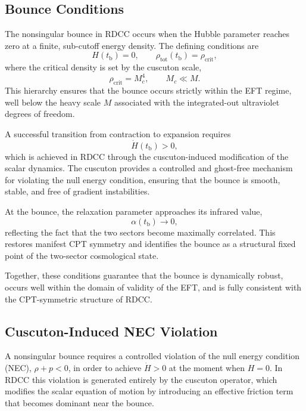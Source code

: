 \documentclass[11pt,a4paper]{article}
\begin{document}
\subsection{Bounce Conditions}

The nonsingular bounce in RDCC occurs when the Hubble parameter reaches zero at a
finite, sub-cutoff energy density. The defining conditions are
\begin{equation}
    H(t_{\mathrm{b}}) = 0,
    \qquad
    \rho_{\mathrm{tot}}(t_{\mathrm{b}}) = \rho_{\mathrm{crit}},
\end{equation}
where the critical density is set by the cuscuton scale,
\begin{equation}
    \rho_{\mathrm{crit}} = M_{c}^{4},
    \qquad
    M_{c} \ll M.
\end{equation}
This hierarchy ensures that the bounce occurs strictly within the EFT regime, well
below the heavy scale \(M\) associated with the integrated-out ultraviolet degrees of
freedom.

A successful transition from contraction to expansion requires
\begin{equation}
    \dot{H}(t_{\mathrm{b}}) > 0,
\end{equation}
which is achieved in RDCC through the cuscuton-induced modification of the scalar
dynamics. The cuscuton provides a controlled and ghost-free mechanism for violating
the null energy condition, ensuring that the bounce is smooth, stable, and free of
gradient instabilities.

At the bounce, the relaxation parameter approaches its infrared value,
\begin{equation}
    \alpha(t_{\mathrm{b}}) \longrightarrow 0,
\end{equation}
reflecting the fact that the two sectors become maximally correlated. This restores
manifest CPT symmetry and identifies the bounce as a structural fixed point of the
two-sector cosmological state.

Together, these conditions guarantee that the bounce is dynamically robust, occurs
well within the domain of validity of the EFT, and is fully consistent with the
CPT-symmetric structure of RDCC.

\subsection{Cuscuton-Induced NEC Violation}

A nonsingular bounce requires a controlled violation of the null energy condition
(NEC), \(\rho + p < 0\), in order to achieve \(\dot{H} > 0\) at the moment when
\(H = 0\). In RDCC this violation is generated entirely by the cuscuton operator,
which modifies the scalar equation of motion by introducing an effective friction
term that becomes dominant near the bounce.
\end{document}
